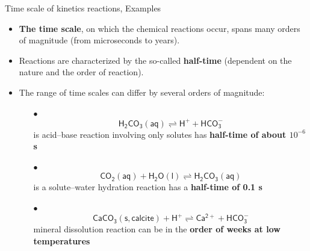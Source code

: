 \begin{frame}[<+->]{Time scale of kinetics reactions, Examples}
	\small
	\begin{itemize}
		\item \textbf{\alert{The time scale}}, on which the chemical reactions occur, spans many orders of magnitude (from microseconds to years).
		\item Reactions are characterized by the so-called  \textbf{\alert{half-time}} (dependent on the nature and the order of reaction).
		\item The range of time scales can differ by several orders of magnitude:
		
		\begin{itemize}
			\item[$\bullet$]
			\[\mathsf{H_2CO_3(aq) \rightleftharpoons H^+ + HCO_3^-}\] 
			is acid–base reaction involving only solutes has \textbf{half-time of about $10^{-6}$ s}
			\item[$\bullet$]
			\[\mathsf{CO_2(aq) + H_2O(l) \rightleftharpoons H_2CO_3(aq)}\] 
			is a solute–water hydration reaction has a \textbf{half-time of 0.1 s}
			
			\item[$\bullet$]
			\[\mathsf{CaCO_3(s, calcite) + H^{+} \rightleftharpoons Ca^{2+} + HCO_3^{-}}\] 
			mineral dissolution reaction can be in the\textbf{ order of weeks at low temperatures}
		\end{itemize}
	\end{itemize}
	
\end{frame}
%
%
